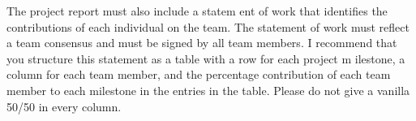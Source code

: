 The project report must also include a statem
ent of work that identifies the
contributions of each individual on the team. The statement of work must reflect a team consensus
and must be signed by all team members. I recommend that you structure this statement as a table
with a row for each project m
ilestone, a column for each team member, and the percentage
contribution of each team member to each milestone in the entries in the table. Please do not give
a vanilla 50/50 in every column.